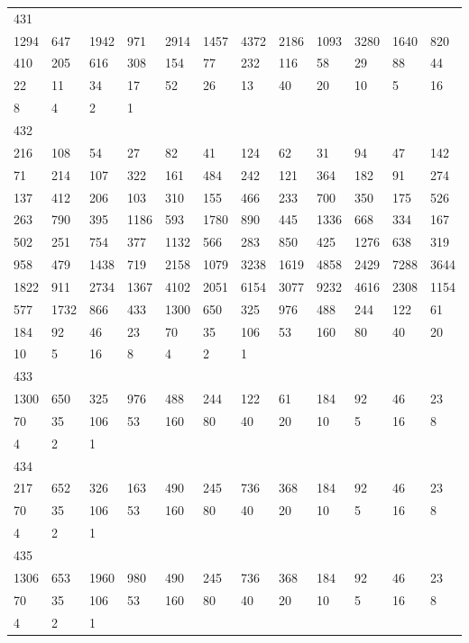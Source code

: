 \begin{longtable}{llllllllllll}
431&&&&&&&&&&&\\
1294& 647& 1942& 971& 2914& 1457& 4372& 2186& 1093& 3280& 1640& 820\\
410& 205& 616& 308& 154& 77& 232& 116& 58& 29& 88& 44\\
22& 11& 34& 17& 52& 26& 13& 40& 20& 10& 5& 16\\
8& 4& 2& 1& \\

432&&&&&&&&&&&\\
216& 108& 54& 27& 82& 41& 124& 62& 31& 94& 47& 142\\
71& 214& 107& 322& 161& 484& 242& 121& 364& 182& 91& 274\\
137& 412& 206& 103& 310& 155& 466& 233& 700& 350& 175& 526\\
263& 790& 395& 1186& 593& 1780& 890& 445& 1336& 668& 334& 167\\
502& 251& 754& 377& 1132& 566& 283& 850& 425& 1276& 638& 319\\
958& 479& 1438& 719& 2158& 1079& 3238& 1619& 4858& 2429& 7288& 3644\\
1822& 911& 2734& 1367& 4102& 2051& 6154& 3077& 9232& 4616& 2308& 1154\\
577& 1732& 866& 433& 1300& 650& 325& 976& 488& 244& 122& 61\\
184& 92& 46& 23& 70& 35& 106& 53& 160& 80& 40& 20\\
10& 5& 16& 8& 4& 2& 1& \\

433&&&&&&&&&&&\\
1300& 650& 325& 976& 488& 244& 122& 61& 184& 92& 46& 23\\
70& 35& 106& 53& 160& 80& 40& 20& 10& 5& 16& 8\\
4& 2& 1& \\

434&&&&&&&&&&&\\
217& 652& 326& 163& 490& 245& 736& 368& 184& 92& 46& 23\\
70& 35& 106& 53& 160& 80& 40& 20& 10& 5& 16& 8\\
4& 2& 1& \\

435&&&&&&&&&&&\\
1306& 653& 1960& 980& 490& 245& 736& 368& 184& 92& 46& 23\\
70& 35& 106& 53& 160& 80& 40& 20& 10& 5& 16& 8\\
4& 2& 1& \\


\end{longtable}
